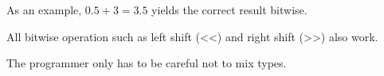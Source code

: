 As an example, $0.5 + 3 = 3.5$ yields the correct result bitwise.\\
\par
\begin{figure}[H]
 \centering
  
  
\end{figure}
\begin{figure}[H]
 \centering
  
  
\end{figure}
\begin{figure}[H]
 \centering
  
  
\end{figure}
\par
All bitwise operation such as left shift (<<) and right shift (>>) also work.\\
\par
 The programmer only has to be careful not to mix types.

\pagebreak

